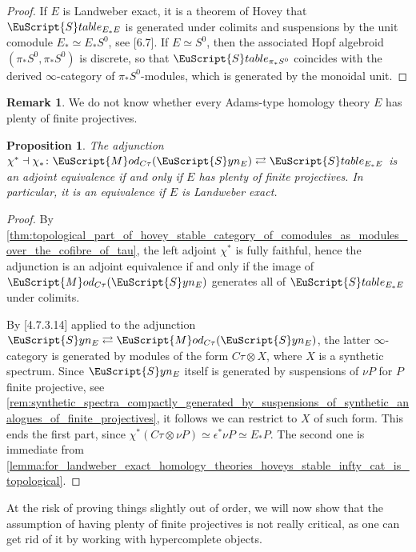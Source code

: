 \documentclass[oneside,a4paper]{amsart}
\newcommand{\euscr}[1]{\EuScript{#1}} %
\newcommand{\stableE}{\euscr{S}table_{E_{*}E}} %
\newcommand{\synspectra}{\euscr{S}yn} %
\newcommand{\Mod}{\euscr{M}od} %
\theoremstyle{plain}
\newtheorem{prop}[thm]{Proposition}
\theoremstyle{definition}
\newtheorem{rem}[thm]{Remark}
\theoremstyle{remark}
\begin{document}
\begin{proof}
If $E$ is Landweber exact, it is a theorem of Hovey that $\stableE$ is generated under colimits and suspensions by the unit comodule $E_{*} \simeq E_{*}S^{0}$, see \cite{hovey2003homotopy}[6.7]. If $E \simeq S^{0}$, then the associated Hopf algebroid $(\pi_{*} S^{0}, \pi_{*}S^{0})$ is discrete, so that $\euscr{S}table_{\pi_{*}S^{0}}$ coincides with the derived $\infty$-category of $\pi_{*}S^{0}$-modules, which is generated by the monoidal unit. 
\end{proof}

\begin{rem}
We do not know whether every Adams-type homology theory $E$ has plenty of finite projectives.
\end{rem}

\begin{prop}
\label{prop:hoveys_category_and_ctau_modules_equivalent_iff_we_have_plenty_of_projectives}
The adjunction $\chi^{*} \dashv \chi_{*} \colon \Mod_{C\tau}(\synspectra_{E}) \rightleftarrows \stableE$ is an adjoint equivalence if and only if $E$ has plenty of finite projectives. In particular, it is an equivalence if $E$ is Landweber exact. 
\end{prop}

\begin{proof}
By \cref{thm:topological_part_of_hovey_stable_category_of_comodules_as_modules_over_the_cofibre_of_tau}, the left adjoint $\chi^{*}$ is fully faithful, hence the adjunction is an adjoint equivalence if and only if the image of $\Mod_{C\tau}(\synspectra_{E})$ generates all of $\stableE$ under colimits. 

By \cite{higher_algebra}[4.7.3.14] applied to the adjunction $\synspectra_{E}  \rightleftarrows \Mod_{C\tau}(\synspectra_{E})$, the latter $\infty$-category is generated by modules of the form $C\tau \otimes X$, where $X$ is a synthetic spectrum. Since $\synspectra_{E}$ itself is generated by suspensions of $\nu P$ for $P$ finite projective, see \cref{rem:synthetic_spectra_compactly_generated_by_suspensions_of_synthetic_analogues_of_finite_projectives}, it follows we can restrict to $X$ of such form. This ends the first part, since $\chi^{*} (C\tau \otimes \nu P) \simeq \epsilon^{*} \nu P \simeq E_{*}P$. The second one is immediate from \cref{lemma:for_landweber_exact_homology_theories_hoveys_stable_infty_cat_is_topological}. 
\end{proof}
At the risk of proving things slightly out of order, we will now show that the assumption of having plenty of finite projectives is not really critical, as one can get rid of it by working with hypercomplete objects. 
\end{document}
